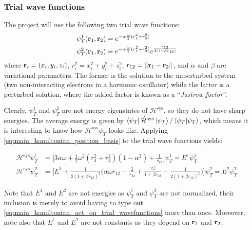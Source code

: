 \documentclass[nofootinbib,reprint,english]{revtex4-1}
\newcommand{\hatHH}{\hat{\mathcal{H}}}
\newcommand{\HH}{\mathcal{H}}
\begin{document}
\subsubsection{Trial wave functions}
The project will use the following two trial wave functions:
\begin{subequations}\label{eq:trial_wavefunctions}
\begin{align}
\psi_T^1(\vb{r}_1,\vb{r}_2)&=e^{-\alpha\frac{\omega}{2}(r_1^2+r_2^2)}\label{eq:wave1}\\
\psi_T^2(\vb{r}_1,\vb{r}_2)&=e^{-\alpha\frac{\omega}{2}(r_1^2+r_2^2)}e^{\frac{r_{12}}{2(1+\beta r_{12})}}\label{eq:wave2}
\end{align}
\end{subequations}
where \(\vb{r}_i=(x_i,y_i,z_i)\), \(r_i^2=x_i^2+y_i^2+z_i^2\), \(r_{12}=||\vb{r}_1-\vb{r}_2||\), and \(\alpha\) and \(\beta\) are variational parameters. The former is the solution to the unperturbed system (two non-interacting electrons in a harmonic oscillator) while the latter is a perturbed solution, where the added factor is known as a ``\emph{Jastrow factor}''.

Clearly, \(\psi_T^1\) and \(\psi_T^2\) are not energy eigenstates of \(\HH^\text{sys}\), so they do not have sharp energies. The average energy is given by \(\bra{\psi_T}\hatHH^\text{sys}\ket{\psi_T}/\braket{\psi_T}\), which means it is interesting to know how \(\HH^\text{sys}\psi_T\) looks like. Applying \eqref{eq:main_hamiltonian_position_basis} to the trial wave functions yields:
\begin{widetext}
\begin{subequations}\label{eq:main_hamiltonian_act_on_trial_wavefunctions}
\begin{align}
\HH^\text{sys}\psi_T^1&=\bigg[3\alpha\omega+\frac{1}{2}\omega^2(r_1^2+r_2^2)(1-\alpha^2)+\frac{1}{r_{12}}\bigg]\psi_T^1=E^1\psi_T^1\label{eq:wave1_local_energy}\\
\HH^\text{sys}\psi_T^2&=\bigg[E^1+\frac{1}{2(1+\beta r_{12})^2}\Big(\alpha\omega r_{12}-\frac{2}{r_{12}}+\frac{2\beta}{1+\beta r_{12}}-\frac{1}{2(1+\beta r_{12})^2}\Big)\bigg]\psi_T^2=E^2\psi_T^2\label{eq:wave2_local_energy}
\end{align}
\end{subequations}
\end{widetext}
Note that \(E^1\) and \(E^2\) are not energies as \(\psi_T^1\) and \(\psi_T^2\) are not normalized, their inclusion is merely to avoid having to type out \eqref{eq:main_hamiltonian_act_on_trial_wavefunctions} more than once. Moreover, note also that \(E^1\) and \(E^2\) are not constants as they depend on \(\vb{r}_1\) and \(\vb{r}_2\).
\end{document}
